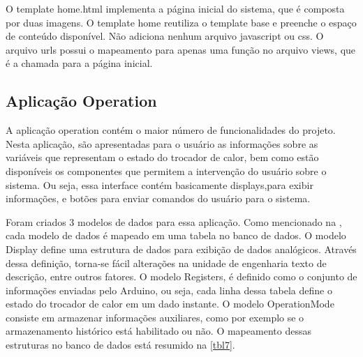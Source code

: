 				O template home.html implementa a página inicial do sistema, que é composta por duas imagens. O template home reutiliza o template base e preenche o espaço de conteúdo disponível. Não adiciona nenhum arquivo javascript ou css. O arquivo urls possui o mapeamento para apenas uma função no arquivo views, que é a chamada para a página inicial.
				
			\subsection{Aplicação Operation}
				A aplicação operation contém o maior número de funcionalidades do projeto. Nesta aplicação, são apresentadas para o usuário as informações sobre as variáveis que representam o estado do trocador de calor, bem como estão disponíveis os componentes que permitem a intervenção do usuário sobre o sistema. Ou seja, essa interface contém basicamente displays,para exibir informações, e botões para enviar comandos do usuário para o sistema.
				
				Foram criados 3 modelos de dados para essa aplicação. Como mencionado na , cada modelo de dados é mapeado em uma tabela no banco de dados. O modelo Display define uma estrutura de dados para exibição de dados analógicos. Através dessa definição, torna-se fácil alterações na unidade de engenharia texto de descrição, entre outros fatores. O modelo Registers, é definido como o conjunto de informações enviadas pelo Arduino, ou seja, cada linha dessa tabela define o estado do trocador de calor em um dado instante. O modelo OperationMode consiste em armazenar informações auxiliares, como por exemplo se o armazenamento histórico está habilitado ou não. O mapeamento dessas estruturas no banco de dados está resumido na \autoref{tbl7}.
				
